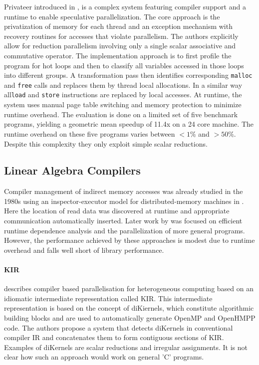     Privateer introduced in \cite{Johnson:2012:SSP:2254064.2254107}, is a
    complex system featuring compiler support and a runtime to enable
    speculative parallelization.
    The core approach is the privatization of memory for each thread and an
    exception mechanism with recovery routines for accesses that violate
    parallelism.
    The authors explicitly allow for reduction parallelism involving only a
    single scalar associative and commutative operator.
    The implementation approach is to first profile the program for hot loops
    and then to classify all variables accessed in those loops into different
    groups.
    A transformation pass then identifies corresponding \texttt{malloc} and
    \texttt{free} calls and replaces them by thread local allocations.
    In a similar way all\texttt{load} and \texttt{store} instructions are
    replaced by local accesses.
    At runtime, the system uses manual page table switching and memory
    protection to minimize runtime overhead.
    The evaluation is done on a limited set of five benchmark programs, yielding
    a geometric mean speedup of 11.4x on a 24 core machine.
    The runtime overhead on these five programs varies between $<1\%$ and
    $>50\%$.
    Despite this complexity they only exploit simple scalar reductions.

\subsection{Linear Algebra Compilers}

    Compiler management of indirect memory accesses was already studied in the
    1980s using an inspector-executor model for distributed-memory machines in
    \citet{Baxter:1989:RPS:72935.72967}.
    Here the location of read data was discovered at runtime and appropriate
    communication automatically inserted.
    Later work by \citet{pottenger1995idiom,fisher1994parallelizing,
    rauchwerger1999lrpd,suganuma1996detection} was focused on efficient runtime
    dependence analysis and the parallelization of more general programs.
    However, the performance achieved by these approaches is modest due to
    runtime overhead and falls well short of library performance.


\paragraph*{KIR}

    \citet{Andion2015Compilation} describes compiler based
    parallelisation for heterogeneous computing based on
    an idiomatic intermediate representation called KIR.
    This intermediate representation is based on the concept of
    \mbox{diKiernels}, which constitute algorithmic building blocks and are used
    to automatically generate OpenMP and OpenHMPP code.
    The authors propose a system that detects diKernels in conventional compiler
    IR and concatenates them to form contiguous sections of KIR.
    Examples of diKernels are scalar reductions and irregular
    assignments.
    It is not clear how such an approach would work on general 'C' programs.


